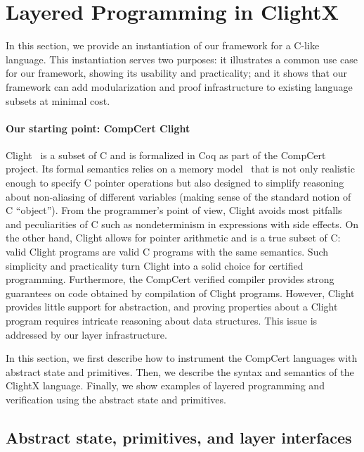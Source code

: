 \section{Layered Programming in ClightX}
\label{sec:seq:clight}

In this section, we provide an instantiation of our framework for a
C-like language. This instantiation serves two purposes: it
illustrates a common use case for our framework, showing its usability
and practicality; and it shows that our framework can add
modularization and proof infrastructure to existing language subsets
at minimal cost.

\paragraph{Our starting point: CompCert Clight}

Clight~\cite{blazy-leroy-clight} is a subset of C and is
formalized in Coq as part of the CompCert project.  Its formal
semantics relies on a memory model~\cite{leroy08} that is not only
realistic enough to specify C pointer operations but also designed to
simplify reasoning about non-aliasing of different
variables (making sense of the standard notion of C ``object'').
From the programmer's point of view, 
Clight avoids most pitfalls and peculiarities of C such
as nondeterminism in expressions with side effects. 
On the other hand,
Clight allows for pointer arithmetic and is a true subset of C: valid
Clight programs are valid C programs with the same semantics.
Such
simplicity and practicality turn Clight into a solid choice for
certified programming.
Furthermore,
the CompCert verified compiler
provides strong guarantees on code
obtained by compilation of Clight programs.
However, Clight provides little support for abstraction,
and proving properties
about a Clight program requires intricate reasoning about
data structures. This issue is addressed by our layer infrastructure.


In this section, we first describe how to instrument the CompCert
languages with abstract state and primitives. Then, we describe the
syntax and semantics of the ClightX language. Finally, we show
examples of layered programming and verification using the abstract
state and primitives.

\subsection{Abstract state, primitives, and layer interfaces}

